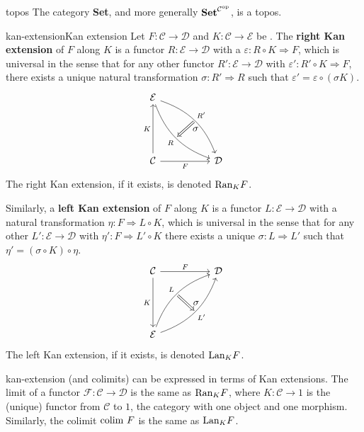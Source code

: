 \begin{example}{topos}
    The category \textbf{Set}, and more generally $\textbf{Set}^{\mathcal{C}^\textup{op}}$, is a topos.
\end{example}

\begin{topic}{kan-extension}{Kan extension}
    Let $F : \mathcal{C} \to \mathcal{D}$ and $K : \mathcal{C} \to \mathcal{E}$ be . The \textbf{right Kan extension} of $F$ along $K$ is a functor $R : \mathcal{E} \to \mathcal{D}$ with a  $\varepsilon : R \circ K \Rightarrow F$, which is universal in the sense that for any other functor $R' : \mathcal{E} \to \mathcal{D}$ with $\varepsilon' : R' \circ K \Rightarrow F$, there exists a unique natural transformation $\sigma : R' \Rightarrow R$ such that $\varepsilon' = \varepsilon \circ (\sigma K)$.
    \[ \begin{tikzcd}[row sep=5em, column sep=5em] \mathcal{E} \arrow[swap, bend right=25]{dr}[name=R1]{R} \arrow[bend left=25]{dr}[name=R2]{R'} \\ \mathcal{C} \arrow[swap]{r}{F} \arrow{u}{K} & \mathcal{D} \arrow[shorten <=2pt,shorten >=2pt,Rightarrow,to path={(R2) -- node[label=right:$\sigma$] {} (R1)}]{}\end{tikzcd} \]
    The right Kan extension, if it exists, is denoted $\textup{Ran}_K F$.

    Similarly, a \textbf{left Kan extension} of $F$ along $K$ is a functor $L : \mathcal{E} \to \mathcal{D}$ with a natural transformation $\eta : F \Rightarrow L \circ K$, which is universal in the sense that for any other $L' : \mathcal{E} \to \mathcal{D}$ with $\eta' : F \Rightarrow L' \circ K$ there exists a unique $\sigma : L \Rightarrow L'$ such that $\eta' = (\sigma \circ K) \circ \eta$.
    \[ \begin{tikzcd}[row sep=5em, column sep=5em] \mathcal{C} \arrow{r}{F} \arrow[swap]{d}{K} & \mathcal{D} \\ \mathcal{E} \arrow[bend left=25]{ur}[name=L1]{L} \arrow[swap, bend right=25]{ur}[name=L2]{L'} \arrow[shorten <=2pt,shorten >=2pt,Rightarrow,to path={(L1) -- node[label=right:$\sigma$] {} (L2)}]{} \end{tikzcd} \]
    The left Kan extension, if it exists, is denoted $\textup{Lan}_K F$.
\end{topic}

\begin{example}{kan-extension}
     (and colimits) can be expressed in terms of Kan extensions. The limit of a functor $\mathcal{F} : \mathcal{C} \to \mathcal{D}$ is the same as $\textup{Ran}_K F$, where $K : \mathcal{C} \to 1$ is the (unique) functor from $\mathcal{C}$ to $1$, the category with one object and one morphism. Similarly, the colimit $\textup{colim } F$ is the same as $\textup{Lan}_K F$.
\end{example}

